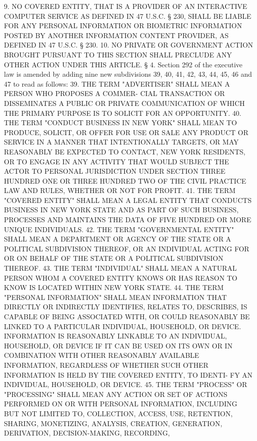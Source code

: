    9. NO COVERED ENTITY, THAT IS A PROVIDER OF  AN  INTERACTIVE  COMPUTER
 SERVICE  AS DEFINED IN 47 U.S.C. § 230, SHALL BE LIABLE FOR ANY PERSONAL
 INFORMATION OR  BIOMETRIC  INFORMATION  POSTED  BY  ANOTHER  INFORMATION
 CONTENT PROVIDER, AS DEFINED IN 47 U.S.C. § 230.
   10.  NO  PRIVATE OR GOVERNMENT ACTION BROUGHT PURSUANT TO THIS SECTION
 SHALL PRECLUDE ANY OTHER ACTION UNDER THIS ARTICLE.
   § 4. Section 292 of the executive law is amended by  adding  nine  new
 subdivisions 39, 40, 41, 42, 43, 44, 45, 46 and 47 to read as follows:
   39.  THE  TERM "ADVERTISER" SHALL MEAN A PERSON WHO PROPOSES A COMMER-
 CIAL TRANSACTION OR DISSEMINATES A PUBLIC OR  PRIVATE  COMMUNICATION  OF
 WHICH THE PRIMARY PURPOSE IS TO SOLICIT FOR AN OPPORTUNITY.
   40.  THE  TERM  "CONDUCT  BUSINESS IN NEW YORK" SHALL MEAN TO PRODUCE,
 SOLICIT, OR OFFER FOR USE OR SALE ANY PRODUCT OR  SERVICE  IN  A  MANNER
 THAT  INTENTIONALLY  TARGETS,  OR MAY REASONABLY BE EXPECTED TO CONTACT,
 NEW YORK RESIDENTS, OR TO ENGAGE IN ANY ACTIVITY THAT WOULD SUBJECT  THE
 ACTOR  TO PERSONAL JURISDICTION UNDER SECTION THREE HUNDRED ONE OR THREE
 HUNDRED TWO OF THE CIVIL PRACTICE LAW AND  RULES,  WHETHER  OR  NOT  FOR
 PROFIT.
   41.  THE TERM "COVERED ENTITY" SHALL MEAN A LEGAL ENTITY THAT CONDUCTS
 BUSINESS IN NEW YORK STATE AND AS PART OF SUCH BUSINESS,  PROCESSES  AND
 MAINTAINS THE DATA OF FIVE HUNDRED OR MORE UNIQUE INDIVIDUALS.
   42.  THE  TERM "GOVERNMENTAL ENTITY" SHALL MEAN A DEPARTMENT OR AGENCY
 OF THE STATE OR A POLITICAL SUBDIVISION THEREOF, OR AN INDIVIDUAL ACTING
 FOR OR ON BEHALF OF THE STATE OR A POLITICAL SUBDIVISION THEREOF.
   43. THE TERM "INDIVIDUAL" SHALL MEAN A NATURAL PERSON WHOM  A  COVERED
 ENTITY KNOWS OR HAS REASON TO KNOW IS LOCATED WITHIN NEW YORK STATE.
   44.  THE  TERM  "PERSONAL  INFORMATION"  SHALL  MEAN  INFORMATION THAT
 DIRECTLY OR INDIRECTLY IDENTIFIES, RELATES TO, DESCRIBES, IS CAPABLE  OF
 BEING  ASSOCIATED  WITH,  OR  COULD REASONABLY BE LINKED TO A PARTICULAR
 INDIVIDUAL, HOUSEHOLD, OR DEVICE.  INFORMATION IS REASONABLY LINKABLE TO
 AN INDIVIDUAL, HOUSEHOLD, OR DEVICE IF IT CAN BE USED ON ITS OWN  OR  IN
 COMBINATION  WITH  OTHER REASONABLY AVAILABLE INFORMATION, REGARDLESS OF
 WHETHER SUCH OTHER INFORMATION IS HELD BY THE COVERED ENTITY, TO IDENTI-
 FY AN INDIVIDUAL, HOUSEHOLD, OR DEVICE.
   45. THE TERM "PROCESS" OR "PROCESSING" SHALL MEAN ANY ACTION OR SET OF
 ACTIONS PERFORMED ON OR WITH PERSONAL  INFORMATION,  INCLUDING  BUT  NOT
 LIMITED  TO,  COLLECTION,  ACCESS,  USE, RETENTION, SHARING, MONETIZING,
 ANALYSIS, CREATION, GENERATION, DERIVATION, DECISION-MAKING,  RECORDING,
